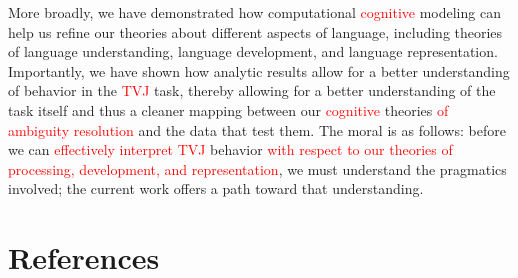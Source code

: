 \documentclass[preprint,authoryear]{elsarticle}\frenchspacing
\newcommand{\lp}[1]{\textcolor{red}{#1}} %
\begin{document}

More broadly, we have demonstrated how computational \lp{cognitive} modeling can help us refine our theories about different aspects of language, including theories of language understanding, language development, and language representation. Importantly, we have shown how analytic results allow for a better understanding of behavior in the 
\lp{TVJ}
task, thereby allowing for a better understanding of the task itself and thus a cleaner mapping between our \lp{cognitive} theories \lp{of ambiguity resolution}  and the data that test them. The moral is as follows: before we can \lp{effectively interpret} 
\lp{TVJ}
behavior \lp{with respect to our theories of processing, development, and representation}, we must understand the pragmatics involved; the current work offers a path toward that understanding. 






\section*{References}



\end{document}

